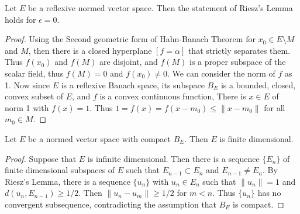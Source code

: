 \begin{prop} Let $E$ be a reflexive normed vector space. Then the statement of Riesz's Lemma holds for $\epsilon=0$.
\end{prop}
\begin{proof}
Using the Second geometric form of Hahn-Banach Theorem for $x_0\in E\setminus M$ and $M$, then there is a closed hyperplane $[f=\alpha]$ that strictly separates them. Thus $f(x_0)$ and $f(M)$ are disjoint, and $f(M)$ is a proper subspace of the scalar field, thus $f(M)=0$ and $f(x_0)\neq 0$. We can consider the norm of $f$ as 1. Now since $E$ is a reflexive Banach space, its subspace $B_E$ is a bounded, closed, convex subset of $E$, and $f$ is a convex continuous function, There is $x\in E$ of norm 1 with $f(x)=1$. Thus $1=f(x)=f(x-m_0)\leq \|x-m_0\|$ for all $m_0\in M$.
\end{proof}

\begin{thm}[Riesz] Let $E$ be a normed vector space with compact $B_E$. Then $E$ is finite dimensional.
\end{thm}
\begin{proof} Suppose that $E$ is infinite dimensional. Then there is a sequence $\{E_n\}$ of finite dimensional subspaces of $E$ such that $E_{n-1}\subset E_n$ and $E_{n-1}\neq E_n$. By Riesz's Lemma, there is a sequence $\{u_n\}$ with $u_n\in E_n$ such that $\|u_n\|=1$ and $d(u_n,E_{n-1})\geq 1/2$. Then $\|u_n-u_m\|\geq 1/2$ for $m<n$. Thus $\{u_n\}$ has no convergent subsequence, contradicting the assumption that $B_E$ is compact.
\end{proof}

